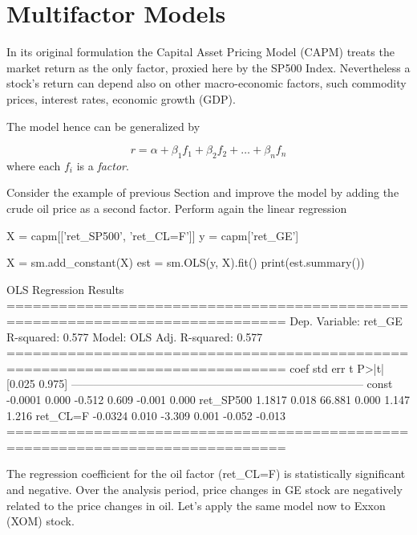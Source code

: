 \section{Multifactor Models}

In its original formulation the Capital Asset Pricing Model (CAPM) treats the market return as the only factor, proxied here by the SP500 Index. Nevertheless a stock’s return can depend also on other macro-economic factors, such commodity prices, interest rates, economic growth (GDP).

The model hence can be generalized by 

\begin{equation}
r=\alpha + \beta_1 f_1 + \beta_2 f_2 +\ldots + \beta_n f_n
\end{equation}
where each $f_i$ is a \emph{factor}.

Consider the example of previous Section and improve the model by adding the crude oil price as a second factor. Perform again the linear regression

\begin{ipython}
X = capm[['ret_SP500', 'ret_CL=F']]
y = capm['ret_GE']

X = sm.add_constant(X)
est = sm.OLS(y, X).fit()
print(est.summary())
\end{ipython} 
\begin{ioutput}
                            OLS Regression Results                            
==============================================================================
Dep. Variable:                 ret_GE   R-squared:                       0.577
Model:                            OLS   Adj. R-squared:                  0.577
==============================================================================
                 coef    std err          t      P>|t|      [0.025      0.975]
------------------------------------------------------------------------------
const         -0.0001      0.000     -0.512      0.609      -0.001       0.000
ret_SP500      1.1817      0.018     66.881      0.000       1.147       1.216
ret_CL=F      -0.0324      0.010     -3.309      0.001      -0.052      -0.013
==============================================================================
\end{ioutput}

The regression coefficient for the oil factor (ret\_CL=F) is statistically significant and negative. Over the analysis period, price changes in GE stock are negatively related to the price changes in oil.
Let's apply the same model now to Exxon (XOM) stock.


